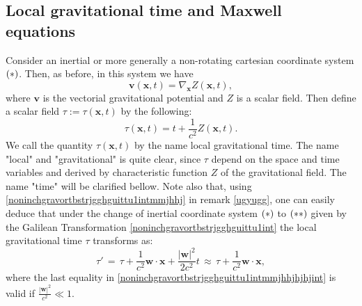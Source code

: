 \documentclass{article}
\theoremstyle{definition}
\theoremstyle{remark}
\renewcommand{\vec}[1]{\mathbf{#1}}
\newcommand{\er}{\eqref}
\newcommand{\er}{\eqref}
\begin{document}
\subsection{Local gravitational time and Maxwell equations}
Consider an inertial or more generally a non-rotating cartesian
coordinate system $\bf{(*)}$. Then, as before, in this system we
have
\begin{equation}\label{jhhjgjhuiiuint}
\vec v(\vec x,t)=\nabla_{\vec x}Z(\vec x,t),
\end{equation}
where $\vec v$ is the vectorial gravitational potential and $Z$ is a
scalar field. Then define a scalar field $\tau:=\tau(\vec x,t)$ by
the following:
\begin{equation}\label{jhhjgjhuiiuiyint}
\tau(\vec x,t)=t+\frac{1}{c^2}Z(\vec x,t).
\end{equation}
We call the quantity $\tau(\vec x,t)$ by the name local
gravitational time. The name "local" and "gravitational" is quite
clear, since $\tau$ depend on the space and time variables and
derived by characteristic function $Z$ of the gravitational field.
The name "time" will be clarified bellow. Note also that, using
\er{noninchgravortbstrjgghguittu1intmmjhhj} in remark \ref{ugyugg},
one can easily deduce that under the change of inertial coordinate
system $\bf{(*)}$ to $\bf{(**)}$ given by the Galilean
Transformation \er{noninchgravortbstrjgghguittu1int} the local
gravitational time $\tau$ transforms as:
\begin{equation}\label{noninchgravortbstrjgghguittu1intmmjhhjhjhjint}
\tau'\,=\,\tau+\frac{1}{c^2}\vec w\cdot\vec x+\frac{|\vec
w|^2}{2c^2}t \,\approx\, \tau+\frac{1}{c^2}\vec w\cdot\vec x,
\end{equation}
where the last equality in
\er{noninchgravortbstrjgghguittu1intmmjhhjhjhjint} is valid if
$\frac{|\vec w|^2}{c^2}\ll 1$.
\end{document}
